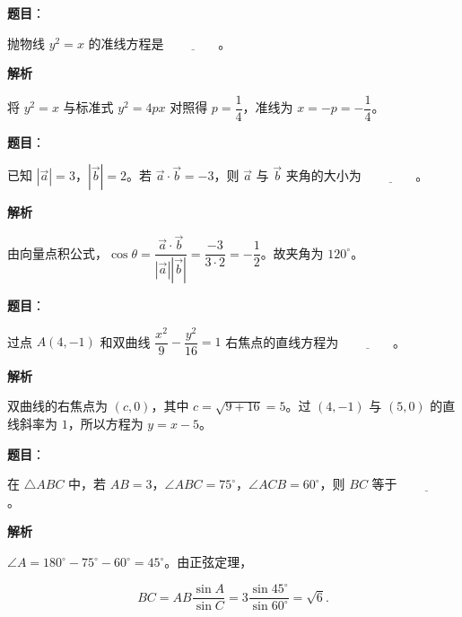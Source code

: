 \begin{answer}

\textbf{题目}：

抛物线 $y^2=x$ 的准线方程是 $\underline{\qquad\qquad}$。

\textbf{解析}

将 $y^2=x$ 与标准式 $y^2=4px$ 对照得 $p=\dfrac14$，准线为 $x=-p=-\dfrac14$。


\end{answer}
\begin{answer}

\textbf{题目}：

已知 $|\vec a|=3$，$|\vec b|=2$。若 $\vec a\cdot\vec b=-3$，则 $\vec a$ 与 $\vec b$ 夹角的大小为 $\underline{\qquad\qquad}$。

\textbf{解析}

由向量点积公式，$\cos\theta=\dfrac{\vec a\cdot\vec b}{|\vec a||\vec b|}=\dfrac{-3}{3\cdot2}=-\dfrac12$。故夹角为 $120^\circ$。


\end{answer}
\begin{answer}

\textbf{题目}：

过点 $A(4,-1)$ 和双曲线 $\dfrac{x^2}{9}-\dfrac{y^2}{16}=1$ 右焦点的直线方程为 $\underline{\qquad\qquad}$。

\textbf{解析}

双曲线的右焦点为 $(c,0)$，其中 $c=\sqrt{9+16}=5$。过 $(4,-1)$ 与 $(5,0)$ 的直线斜率为 $1$，所以方程为 $y=x-5$。


\end{answer}
\begin{answer}

\textbf{题目}：

在 $\triangle ABC$ 中，若 $AB=3$，$\angle ABC=75^\circ$，$\angle ACB=60^\circ$，则 $BC$ 等于 $\underline{\qquad\qquad}$。

\textbf{解析}

$\angle A=180^\circ-75^\circ-60^\circ=45^\circ$。由正弦定理，

\nopagebreak[4]
\[
BC=AB\frac{\sin A}{\sin C}=3\frac{\sin45^\circ}{\sin60^\circ}=\sqrt6.
\]


\end{answer}
